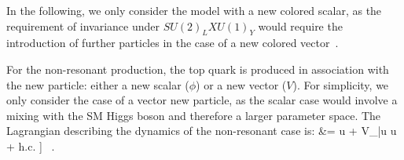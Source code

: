 % 
In the following, we only consider the model with a new colored scalar, as the requirement of invariance
under $SU(2)_L X U(1)_Y$ would require the introduction of further particles in the case of a new colored vector~\cite{Boucheneb:2014wza}.

\label{sec:NonResonantProd}

For the non-resonant production, the top quark is produced in association with the new particle:
either a new scalar ($\phi$) or a new vector ($V$). For simplicity, we only consider the case of a vector new particle, as the scalar case would involve a mixing with the SM Higgs boson and therefore a larger parameter space. The Lagrangian describing the dynamics of the non-resonant case is: 
\be\label{eq:lagrangianNonResonantVector}\bsp
\lag &=
\bigg[
\phi \bar u \Big[a^0_{FC}\!+\!b^0_{FC} \gamma_5 \Big] u \!+\!
V_\mu \bar u \gmu {} u  
%
+ \rm h.c. 
\bigg] \ .
\esp\ee

